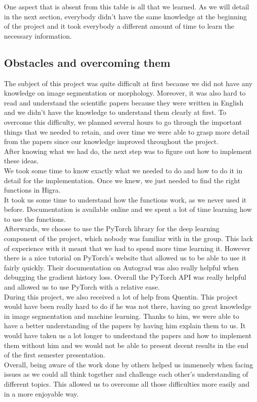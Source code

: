 One aspect that is absent from this table is all that we learned.
As we will detail in the next section, everybody didn't have the same knowledge
at the beginning of the project and it took everybody a different amount of
time to learn the necessary information.\\

\clearpage
\subsection{Obstacles and overcoming them}

The subject of this project was quite difficult at first because we did not have
any knowledge on image segmentation or morphology. Moreover, it was also hard to read and
understand the scientific papers because they were written in English and
we didn't have the knowledge to understand them clearly at first. To overcome this difficulty, we planned several
hours to go through the important things that we needed to retain, and over
time we were able to grasp more detail from the papers since our knowledge
improved throughout the project.\\

After knowing what we had do, the next step was to figure out how to implement
these ideas.\\
We took some time to know exactly what we needed to do and how to do it in detail for the implementation.
Once we knew, we just needed to find the right functions in Higra.\\
It took us some time to understand how the functions work, as we never used it before.
Documentation is available online and we spent a lot of time learning how to use the
functions.\\
Afterwards, we choose to use the PyTorch library for the deep learning
component of the project, which nobody was familiar with in the group. 
This lack of experience with it meant that we had to spend more time learning
it. However there is a nice tutorial on PyTorch's website that allowed us to
be able to use it fairly quickly. Their documentation on Autograd was also
really helpful when debugging the gradient history loss. Overall the PyTorch
API was really helpful and allowed us to use PyTorch with a relative ease.\\

During this project, we also received a lot of help from Quentin. This project would
have been really hard to do if he was not there, having no great knowledge in
image segmentation and machine learning. Thanks to him, we were able to have a
better understanding of the papers by having him explain them to us. It would have taken us
a lot longer to understand the papers and how to implement them without him and we would 
not be able to present decent results in the end of the first semester presentation.\\

Overall, being aware of the work done by others helped us immensely when
facing issues as we could all think together and challenge each other's
understanding of different topics. This allowed us to overcome all those
difficulties more easily and in a more enjoyable way.

